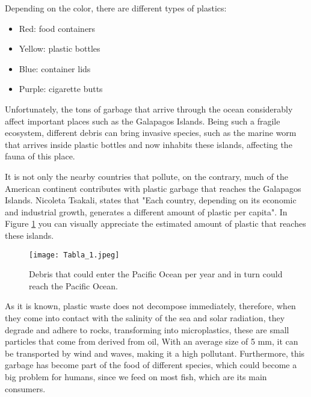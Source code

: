 \documentclass[10pt,english, openany]{book}
\begin{document}
\pagebreak

Depending on the color, there are different types of plastics:

\begin{itemize}
    \item Red: food containers
    \item Yellow: plastic bottles
    \item Blue: container lids
    \item Purple: cigarette butts 
\end{itemize}

Unfortunately, the tons of garbage that arrive through the ocean considerably affect important places such as the Galapagos Islands. Being such a fragile ecosystem, different debris can bring invasive species, such as the marine worm that arrives inside plastic bottles and now inhabits these islands, affecting the fauna of this place. \cite{WWF}

It is not only the nearby countries that pollute, on the contrary, much of the American continent contributes with plastic garbage that reaches the Galapagos Islands. Nicoleta Tsakali, states that "Each country, depending on its economic and industrial growth, generates a different amount of plastic per capita". \cite{Schofield2020} In Figure \ref{fig5:spect} you can visually appreciate the estimated amount of plastic that reaches these islands.

\vspace{1cm}

\begin{figure}[h!]
    \centering\texttt{[image: Tabla\_1.jpeg]}
    \caption{Debris that could enter the Pacific Ocean per year and in turn could reach the Pacific Ocean. \cite{Tsakali2019}}
    \label{fig5:spect}
\end{figure}
    
\vspace{0.5cm}

\pagebreak

As it is known, plastic waste does not decompose immediately, therefore, when they come into contact with the salinity of the sea and solar radiation, they degrade and adhere to rocks,  transforming into microplastics,\cite{Universo} these are small particles that come from derived from oil, With an average size of 5 mm, it can be transported by wind and waves, making it a high pollutant. \cite{Ecuadortv} Furthermore, this garbage has become part of the food of different species, which could become a big problem for humans, since we feed on most fish, which are its main consumers. \cite{Comercio}
\end{document}
